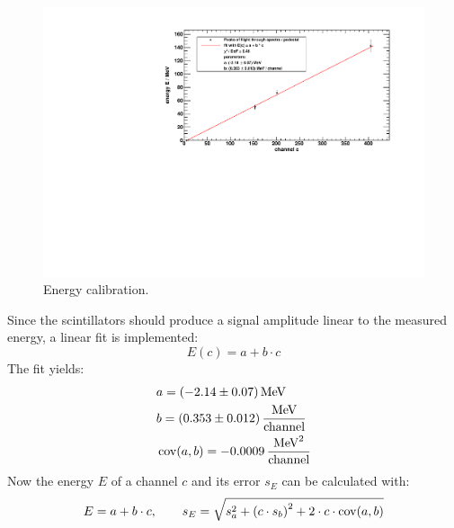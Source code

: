 
\begin{figure}[H]
\begin{center}
  \includegraphics[width=\textwidth]{../img/energyCalibration.pdf}
  \caption{Energy calibration.}
  \label{img:energycalibration}
\end{center}
\end{figure}
Since the scintillators should produce a signal amplitude linear to the measured energy, a linear fit is implemented:
\begin{equation}
    E(c) = a + b \cdot c
\end{equation}
The fit yields:
\begin{equation}
    \begin{split}
        & a = (-2.14 \pm 0.07) \, \text{MeV} \\
        & b = (0.353 \pm 0.012) \, \frac{\text{MeV}}{\text{channel}} \\
        & \operatorname{cov}(a, b) = -0.0009 \, \frac{\text{MeV}^2}{\text{channel}} 
    \end{split}
\end{equation}
Now the energy $E$ of a channel $c$ and its error $s_E$ can be calculated with:
\begin{equation}
\label{eq:ecalibration}
    E = a + b \cdot c, \qquad s_E = \sqrt{s_a^2 + \left(c \cdot s_b \right)^2 + 2 \cdot c \cdot \operatorname{cov}(a,b)}
\end{equation}


